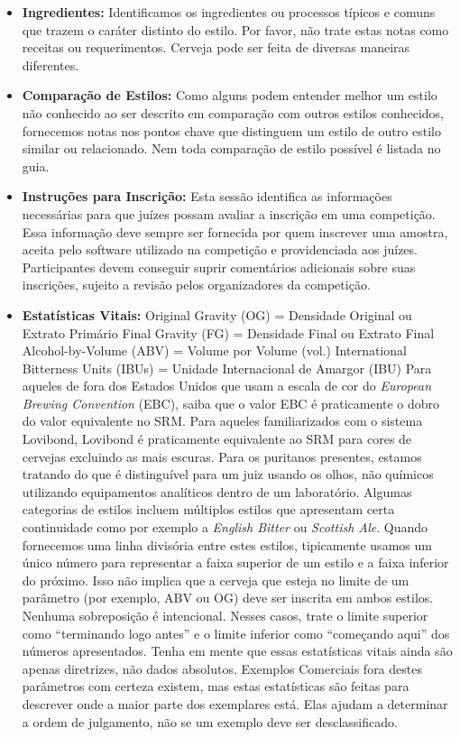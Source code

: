 \begin{itemize}
\item \textbf{Ingredientes:} Identificamos os ingredientes ou processos típicos e comuns que trazem o caráter distinto do estilo. Por favor, não trate estas notas como receitas ou requerimentos. Cerveja pode ser feita de diversas maneiras diferentes.
\item \textbf{Comparação de Estilos:} Como alguns podem entender melhor um estilo não conhecido ao ser descrito em comparação com outros estilos conhecidos, fornecemos notas nos pontos chave que distinguem um estilo de outro estilo similar ou relacionado. Nem toda comparação de estilo possível é listada no guia.
\item \textbf{Instruções para Inscrição:} Esta sessão identifica as informações necessárias para que juízes possam avaliar a inscrição em uma competição. Essa informação deve sempre ser fornecida por quem inscrever uma amostra, aceita pelo software utilizado na competição e providenciada aos juízes. Participantes devem conseguir suprir comentários adicionais sobre suas inscrições, sujeito a revisão pelos organizadores da competição.
\item \textbf{Estatísticas Vitais:}
Original Gravity (OG) = Densidade Original ou Extrato Primário
Final Gravity (FG) = Densidade Final ou Extrato Final
Alcohol-by-Volume (ABV) = Volume por Volume (vol.)
International Bitterness Units (IBUs) = Unidade Internacional de Amargor (IBU)
Para aqueles de fora dos Estados Unidos que usam a escala de cor do \textit{European Brewing Convention} (EBC), saiba que o valor EBC é praticamente o dobro do valor equivalente no SRM. Para aqueles familiarizados com o sistema Lovibond, Lovibond é praticamente equivalente ao SRM para cores de cervejas excluindo as mais escuras. Para os puritanos presentes, estamos tratando do que é distinguível para um juiz usando os olhos, não químicos utilizando equipamentos analíticos dentro de um laboratório.
Algumas categorias de estilos incluem múltiplos estilos que apresentam certa continuidade como por exemplo a \textit{English Bitter} ou \textit{Scottish Ale}. Quando fornecemos uma linha divisória entre estes estilos, tipicamente usamos um único número para representar a faixa superior de um estilo e a faixa inferior do próximo. Isso não implica que a cerveja que esteja no limite de um parâmetro (por exemplo, ABV ou OG) deve ser inscrita em ambos estilos. Nenhuma sobreposição é intencional. Nesses casos, trate o limite superior como “terminando logo antes” e o limite inferior como “começando aqui” dos números apresentados.
Tenha em mente que essas estatísticas vitais ainda são apenas diretrizes, não dados absolutos. Exemplos Comerciais fora destes parâmetros com certeza existem, mas estas estatísticas são feitas para descrever onde a maior parte dos exemplares está. Elas ajudam a determinar a ordem de julgamento, não se um exemplo deve ser desclassificado.

\end{itemize}
